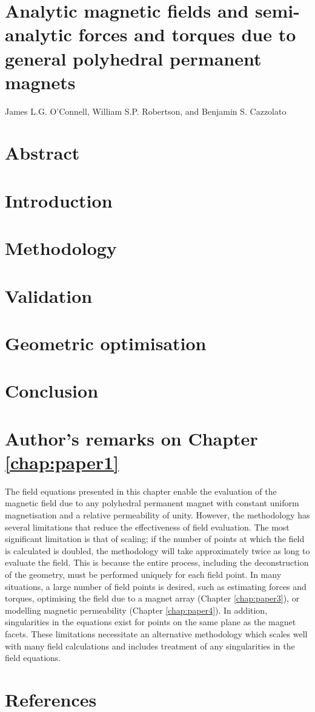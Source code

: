 %
%
\section*{\LARGE Analytic magnetic fields and semi-analytic forces and torques due to general polyhedral permanent magnets}
James L.G. O'Connell, William S.P. Robertson, and Benjamin S. Cazzolato
\section*{Abstract}\label{sec:p1abstract}

\section{Introduction}\label{sec:p1introduction}

\section{Methodology}\label{sec:p1methodology}

\section{Validation}\label{sec:p1validation}

\section{Geometric optimisation}\label{sec:p1geometricOptimisation}

\section{Conclusion}\label{sec:p1conclusion}

\clearpage
\section*{Author's remarks on Chapter \ref{chap:paper1}}
The field equations presented in this chapter enable the evaluation of the magnetic field due to any polyhedral permanent magnet with constant uniform magnetisation and a relative permeability of unity. However, the methodology has several limitations that reduce the effectiveness of field evaluation. The most significant limitation is that of scaling; if the number of points at which the field is calculated is doubled, the methodology will take approximately twice as long to evaluate the field. This is because the entire process, including the deconstruction of the geometry, must be performed uniquely for each field point. In many situations, a large number of field points is desired, such as estimating forces and torques, optimising the field due to a magnet array (Chapter \ref{chap:paper3}), or modelling magnetic permeability (Chapter \ref{chap:paper4}). In addition, singularities in the equations exist for points on the same plane as the magnet facets. These limitations necessitate an alternative methodology which scales well with many field calculations and includes treatment of any singularities in the field equations.

\newpage
\section*{References}
\printbibliography[heading=none]